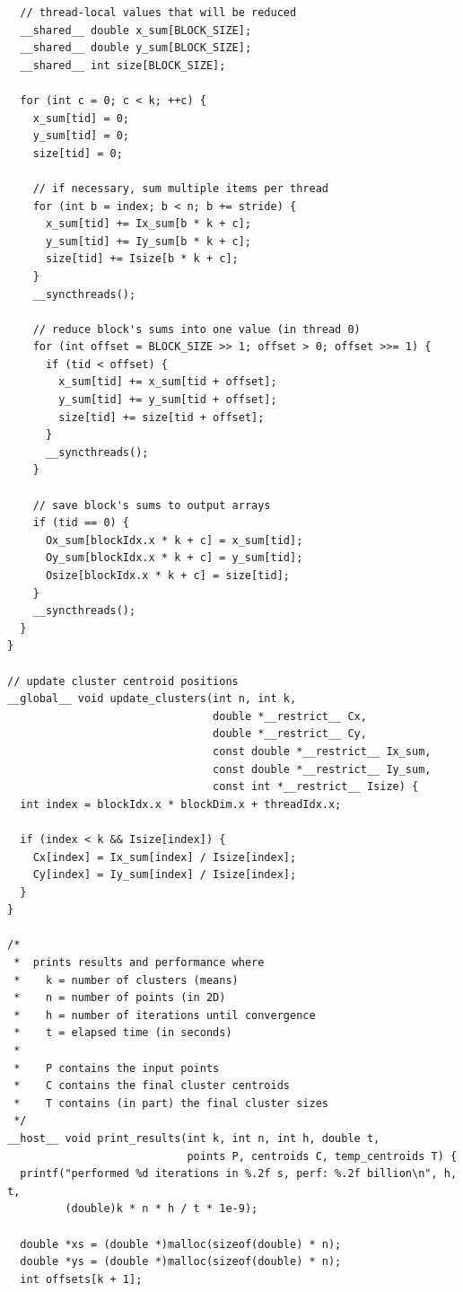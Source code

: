 \documentclass{article}
\begin{document}
\begin{lstlisting}
  // thread-local values that will be reduced
  __shared__ double x_sum[BLOCK_SIZE];
  __shared__ double y_sum[BLOCK_SIZE];
  __shared__ int size[BLOCK_SIZE];

  for (int c = 0; c < k; ++c) {
    x_sum[tid] = 0;
    y_sum[tid] = 0;
    size[tid] = 0;

    // if necessary, sum multiple items per thread
    for (int b = index; b < n; b += stride) {
      x_sum[tid] += Ix_sum[b * k + c];
      y_sum[tid] += Iy_sum[b * k + c];
      size[tid] += Isize[b * k + c];
    }
    __syncthreads();

    // reduce block's sums into one value (in thread 0)
    for (int offset = BLOCK_SIZE >> 1; offset > 0; offset >>= 1) {
      if (tid < offset) {
        x_sum[tid] += x_sum[tid + offset];
        y_sum[tid] += y_sum[tid + offset];
        size[tid] += size[tid + offset];
      }
      __syncthreads();
    }

    // save block's sums to output arrays
    if (tid == 0) {
      Ox_sum[blockIdx.x * k + c] = x_sum[tid];
      Oy_sum[blockIdx.x * k + c] = y_sum[tid];
      Osize[blockIdx.x * k + c] = size[tid];
    }
    __syncthreads();
  }
}

// update cluster centroid positions
__global__ void update_clusters(int n, int k,
                                double *__restrict__ Cx,
                                double *__restrict__ Cy,
                                const double *__restrict__ Ix_sum,
                                const double *__restrict__ Iy_sum,
                                const int *__restrict__ Isize) {
  int index = blockIdx.x * blockDim.x + threadIdx.x;

  if (index < k && Isize[index]) {
    Cx[index] = Ix_sum[index] / Isize[index];
    Cy[index] = Iy_sum[index] / Isize[index];
  }
}

/*
 *  prints results and performance where
 *    k = number of clusters (means)
 *    n = number of points (in 2D)
 *    h = number of iterations until convergence
 *    t = elapsed time (in seconds)
 *
 *    P contains the input points
 *    C contains the final cluster centroids
 *    T contains (in part) the final cluster sizes
 */
__host__ void print_results(int k, int n, int h, double t,
                            points P, centroids C, temp_centroids T) {
  printf("performed %d iterations in %.2f s, perf: %.2f billion\n", h, t,
         (double)k * n * h / t * 1e-9);

  double *xs = (double *)malloc(sizeof(double) * n);
  double *ys = (double *)malloc(sizeof(double) * n);
  int offsets[k + 1];


\end{lstlisting}
\end{document}
